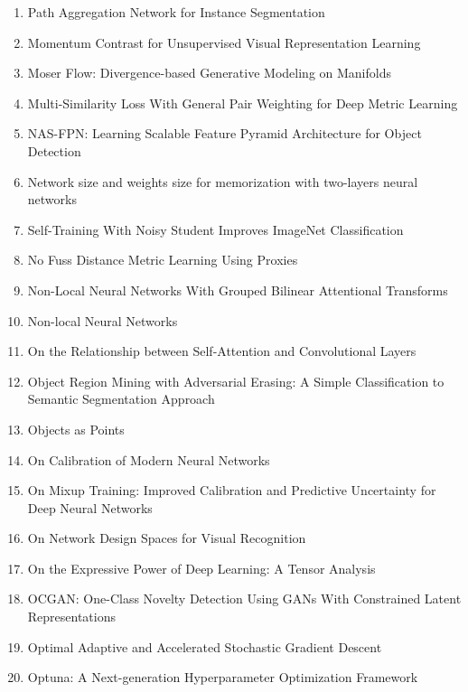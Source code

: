 \documentclass[acmlarge]{acmart}
\begin{document}
\begin{enumerate}
	\item Path Aggregation Network for Instance Segmentation \cite{Liu2018PathAN}
	\item Momentum Contrast for Unsupervised Visual Representation Learning \cite{He2020MomentumCF}
	\item Moser Flow: Divergence-based Generative Modeling on Manifolds \cite{Rozen2021MoserFD}
	\item Multi-Similarity Loss With General Pair Weighting for Deep Metric Learning \cite{Wang2019MultiSimilarityLW}
	\item NAS-FPN: Learning Scalable Feature Pyramid Architecture for Object Detection \cite{Ghiasi2019NASFPNLS}
	\item Network size and weights size for memorization with two-layers neural networks \cite{Bubeck2020NetworkSA}
	\item Self-Training With Noisy Student Improves ImageNet Classification \cite{Xie2020SelfTrainingWN}
	\item No Fuss Distance Metric Learning Using Proxies \cite{MovshovitzAttias2017NoFD}
	\item Non-Local Neural Networks With Grouped Bilinear Attentional Transforms \cite{Chi2020NonLocalNN}
	\item Non-local Neural Networks \cite{Wang2018NonlocalNN}
	\item On the Relationship between Self-Attention and Convolutional Layers \cite{Cordonnier2020OnTR}
	\item Object Region Mining with Adversarial Erasing: A Simple Classification to Semantic Segmentation Approach \cite{Wei2017ObjectRM}
	\item Objects as Points \cite{Zhou2019ObjectsAP}
	\item On Calibration of Modern Neural Networks \cite{Guo2017OnCO}
	\item On Mixup Training: Improved Calibration and Predictive Uncertainty for Deep Neural Networks \cite{Thulasidasan2019OnMT}
	\item On Network Design Spaces for Visual Recognition \cite{Radosavovic2019OnND}
	\item On the Expressive Power of Deep Learning: A Tensor Analysis \cite{Cohen2015OnTE}
	\item OCGAN: One-Class Novelty Detection Using GANs With Constrained Latent Representations \cite{Perera2019OCGANON}
	\item Optimal Adaptive and Accelerated Stochastic Gradient Descent \cite{Deng2018OptimalAA}
	\item Optuna: A Next-generation Hyperparameter Optimization Framework \cite{Akiba2019OptunaAN}

\end{enumerate}
\end{document}
